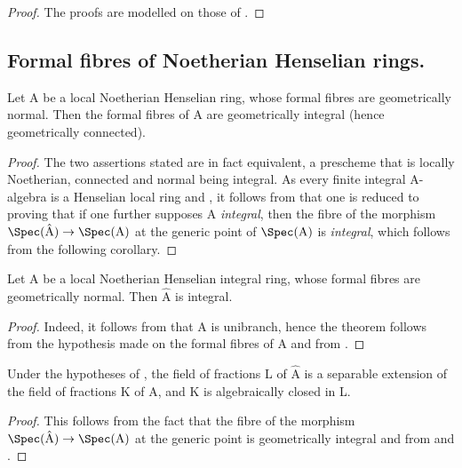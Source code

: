 \begin{proof}
The proofs are modelled on those of .
\end{proof}


\subsection{Formal fibres of Noetherian Henselian rings.}
\label{subsection:IV.18.9}

\begin{theorem}[18.9.1]
\label{IV.18.9.1}
Let $\mathrm{A}$ be a local Noetherian Henselian ring, whose formal fibres are geometrically normal.
Then the formal fibres of $\mathrm{A}$ are geometrically integral (hence geometrically connected).
\end{theorem}

\begin{proof}
The two assertions stated are in fact equivalent, a prescheme that is locally Noetherian, connected and normal being integral.
As every finite integral A-algebra is a Henselian local ring  and , it follows from  that one is reduced to proving that if one further supposes A \emph{integral}, then the fibre of the morphism $\Spec(\hat{\mathrm{A}})\to\Spec(\mathrm{A})$ at the generic point of $\Spec(\mathrm{A})$ is \emph{integral}, which follows from the following corollary.
\end{proof}

\begin{corollary}[18.9.2]
\label{IV.18.9.2}
Let $\mathrm{A}$ be a local Noetherian Henselian integral ring, whose formal fibres are geometrically normal.
Then $\hat{\mathrm{A}}$ is integral.
\end{corollary}

\begin{proof}
Indeed, it follows from  that A is unibranch, hence the theorem follows from the hypothesis made on the formal fibres of A and from .
\end{proof}

\begin{corollary}[18.9.3]
\label{IV.18.9.3}
Under the hypotheses of , the field of fractions L of $\hat{\mathrm{A}}$ is a separable extension of the field of fractions K of A, and K is algebraically closed in L.
\end{corollary}

\begin{proof}
This follows from the fact that the fibre of the morphism $\Spec(\hat{\mathrm{A}})\to\Spec(\mathrm{A})$ at the generic point is geometrically integral and from  and .
\end{proof}


